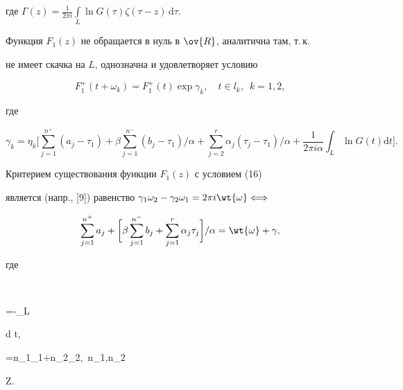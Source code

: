 где $\Gamma (z)=\frac {1}{2\pi i}\int\limits_{L} \ln G(\tau)


\zeta(\tau-z)\,\mathrm d\tau$.





Функция $F_{1}(z)$ не обращается в нуль в $\ov{R}$, аналитична там, т.\,к.


не имеет скачка на $L$, однозначна и удовлетворяет условию


\begin{equation}


F_{1}^{+}(t+\omega_k) =F_{1}^{+}(t)\exp\gamma _k,\quad


t\in l_{k},\ \; k=1,2,


\end{equation}


где


$$


\gamma_{k}=\eta_k\bigg[\sum_{j=1}^{n^+}(a_j-\tau_1)+


\beta\sum_{j=1}^{n^-}(b_j-\tau_1)/\alpha


+\sum_{j=2}^{r}\alpha_{j}(\tau_j-\tau_1)/\alpha+


\frac{1}{2\pi i\alpha}


\int_{L} \ln G(t)\mathrm d t\bigg].


$$





Критерием существования функции $ F_{1}(z)$ с условием (16)


является (напр., [9]) равенство $\gamma_1\omega_2 -\gamma_2\omega_1=


2\pi i \wt{\omega} \Longleftrightarrow$


\begin{equation}


\sum_{j=1}^{n^+}a_j +\bigg[ \beta


\sum_{j=1}^{n^-}b_j +\sum_{j=1}^{r}\alpha_{j}\tau_j \bigg]/\alpha=


\wt{\omega} +\gamma,


\end{equation}


где


$$


\gamma=-\int_{L}


\ln [G(t)t^{\varkappa}]\mathrm d t,\quad


\wt{\omega}=n_1\omega_{1}+n_{2}\omega_{2},\ \;n_1,n_2


\in \Bbb Z.


